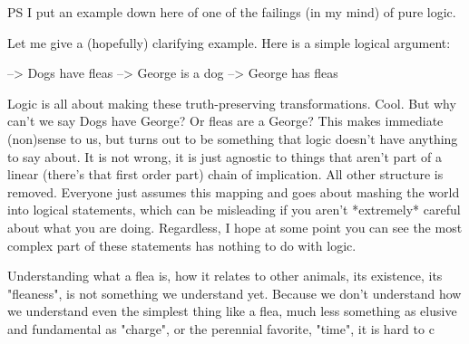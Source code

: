 
PS I put an example down here of one of the failings (in my mind) of pure logic.  

Let me give a (hopefully) clarifying example.  Here is a simple logical argument:

  --> Dogs have fleas
  --> George is a dog
  --> George has fleas

Logic is all about making these truth-preserving transformations.  Cool.  But why can't we say Dogs have George?  Or fleas are a George?  This makes immediate (non)sense to us, but turns out to be something that logic doesn't have anything to say about.  It is not wrong, it is just agnostic to things that aren't part of a linear (there's that first order part) chain of implication.  All other structure is removed.  Everyone just assumes this mapping and goes about mashing the world into logical statements, which can be misleading if you aren't *extremely* careful about what you are doing.  Regardless, I hope at some point you can see the most complex part of these statements has nothing to do with logic.

Understanding what a flea is, how it relates to other animals, its existence, its "fleaness", is not something we understand yet.  Because we don't understand how we understand even the simplest thing like a flea, much less something as elusive and fundamental as "charge", or the perennial favorite, "time", it is hard to c













































































